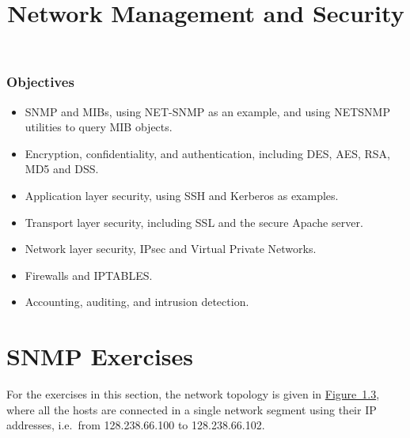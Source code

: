 \documentclass{../UTNetLab}
\title{Network Management and Security}
\begin{document}
\section*{Objectives}
\begin{itemize}
    \item SNMP and MIBs, using NET-SNMP as an example, and using NETSNMP utilities to query MIB objects.
    \item Encryption, confidentiality, and authentication, including DES, AES, RSA, MD5 and DSS.
    \item Application layer security, using SSH and Kerberos as examples.
    \item Transport layer security, including SSL and the secure Apache server.
    \item Network layer security, IPsec and Virtual Private Networks.
    \item Firewalls and IPTABLES.
    \item Accounting, auditing, and intrusion detection.
\end{itemize}

\part{SNMP Exercises}
For the exercises in this section, the network topology is given in \hyperref[fig:1.3]{Figure~1.3}, where all the hosts are connected in a single network segment using their IP addresses, i.e.\  from 128.238.66.100 to 128.238.66.102.
\end{document}
